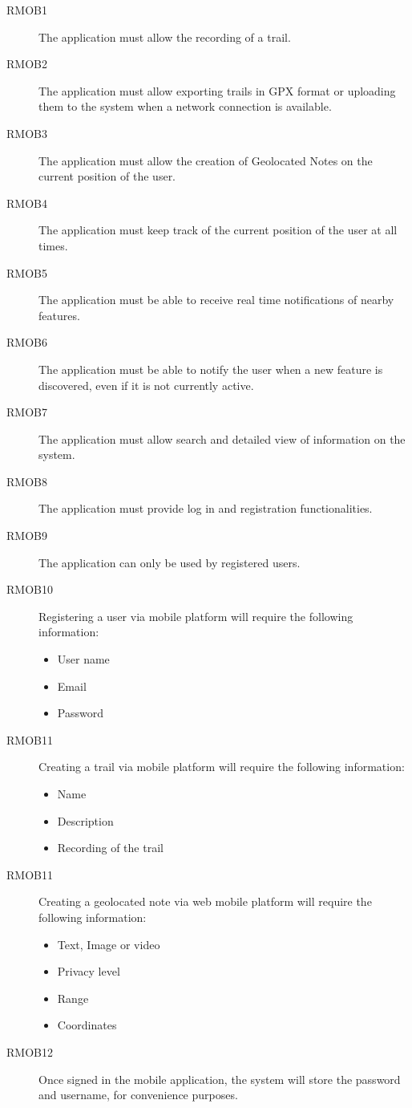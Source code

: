 \begin{description}
\item[RMOB1] The application must allow the recording of a trail.
\item[RMOB2] The application must allow exporting trails in GPX format or uploading them to the system when a network connection is available.
\item[RMOB3] The application must allow the creation of Geolocated Notes on the current position of the user.
\item[RMOB4] The application must keep track of the current position of the user at all times.
\item[RMOB5] The application must be able to receive real time notifications of nearby features.
\item[RMOB6] The application must be able to notify the user when a new feature is discovered, even if it is not currently active.
\item[RMOB7] The application must allow search and detailed view of information on the system.
\item[RMOB8] The application must provide log in and registration functionalities.
\item[RMOB9] The application can only be used by registered users.
\item[RMOB10] Registering a user via mobile platform will require the following information:
  \begin{itemize}
  \item User name
  \item Email
  \item Password
  \end{itemize}
\item[RMOB11] Creating a trail via mobile platform will require the following information:
  \begin{itemize}
  \item Name
  \item Description
  \item Recording of the trail
  \end{itemize}
\item[RMOB11] Creating a geolocated note via web mobile platform will require the following information:
  \begin{itemize}
  \item Text, Image or video
  \item Privacy level
  \item Range
  \item Coordinates
  \end{itemize} 
\item[RMOB12] Once signed in the mobile application, the system will store the password and username, for convenience purposes.
\end{description}

